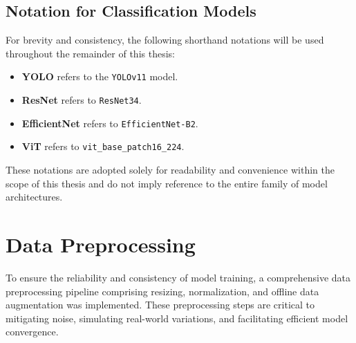 

\subsection{Notation for Classification Models}

For brevity and consistency, the following shorthand notations will be used throughout the remainder of this thesis:

\begin{itemize}
    \item \textbf{\ac{YOLO}} refers to the \texttt{YOLOv11} model.
    \item \textbf{\ac{ResNet}} refers to \texttt{ResNet34}.
    \item \textbf{EfficientNet} refers to \texttt{EfficientNet-B2}.
    \item \textbf{\ac{ViT}} refers to \texttt{vit\_base\_patch16\_224}.
\end{itemize}

These notations are adopted solely for readability and convenience within the scope of this thesis and do not imply
reference to the entire family of model architectures.

\section{Data Preprocessing}

To ensure the reliability and consistency of model training, a comprehensive data preprocessing
pipeline comprising resizing, normalization, and offline data augmentation was implemented. These preprocessing
steps are critical to mitigating noise, simulating real-world variations, and facilitating efficient model convergence.




